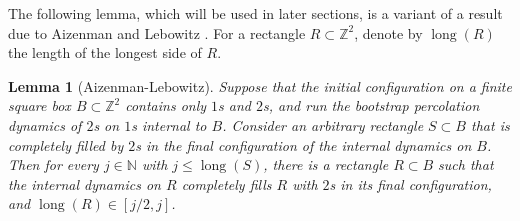\documentclass{article}
\newcommand{\N}{\mathbb{N}}
\newcommand{\bZ}{{\mathbb Z}}
\numberwithin{equation}{section}
\newtheorem{lemma}[theorem]{Lemma}
\begin{document}
The following lemma, which will be used in later sections, is a variant of a result due to Aizenman and Lebowitz \cite{AizenmanLebowitz}.
For a rectangle $R \subset \bZ^2$, denote by $\operatorname{long}(R)$ the length of the longest side of $R$.

\begin{lemma}[Aizenman-Lebowitz]
\label{lem:Aizenman-Lebowitz}
    Suppose that the initial configuration on a finite square box $B \subset \bZ^2$ contains only $1$s and $2$s, and run the bootstrap percolation dynamics of $2$s on $1$s internal to $B$.
    Consider an arbitrary rectangle $S \subset B$ that is completely filled by $2$s in the final configuration of the internal dynamics on $B$.
    Then for every $j \in \N$ with $j \leq \operatorname{long}(S)$, 
    there is a rectangle $R \subset B$ such that the internal dynamics on $R$ completely fills $R$ with $2$s in its final configuration, and $\operatorname{long}(R) \in [j/2, j]$.
\end{lemma}

\end{document}

